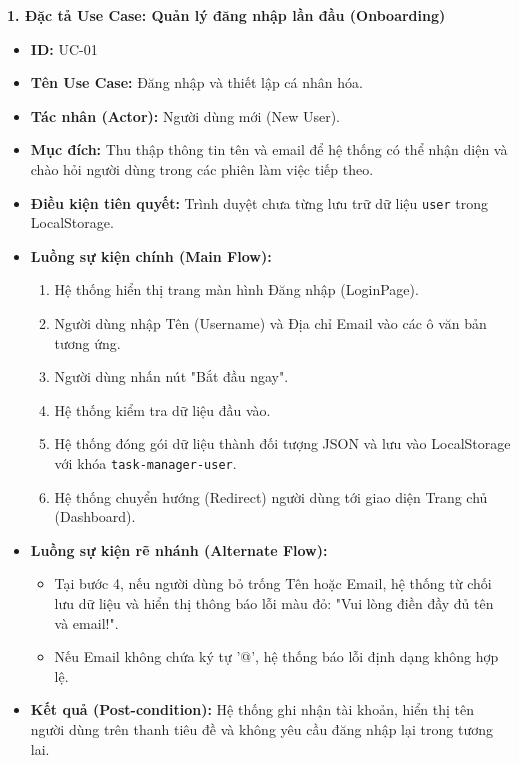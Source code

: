 \textbf{1. Đặc tả Use Case: Quản lý đăng nhập lần đầu (Onboarding)}
\begin{itemize}
    \item \textbf{ID:} UC-01
    \item \textbf{Tên Use Case:} Đăng nhập và thiết lập cá nhân hóa.
    \item \textbf{Tác nhân (Actor):} Người dùng mới (New User).
    \item \textbf{Mục đích:} Thu thập thông tin tên và email để hệ thống có thể nhận diện và chào hỏi người dùng trong các phiên làm việc tiếp theo.
    \item \textbf{Điều kiện tiên quyết:} Trình duyệt chưa từng lưu trữ dữ liệu \texttt{user} trong LocalStorage.
    \item \textbf{Luồng sự kiện chính (Main Flow):}
    \begin{enumerate}
        \item Hệ thống hiển thị trang màn hình Đăng nhập (LoginPage).
        \item Người dùng nhập Tên (Username) và Địa chỉ Email vào các ô văn bản tương ứng.
        \item Người dùng nhấn nút "Bắt đầu ngay".
        \item Hệ thống kiểm tra dữ liệu đầu vào.
        \item Hệ thống đóng gói dữ liệu thành đối tượng JSON và lưu vào LocalStorage với khóa \texttt{task-manager-user}.
        \item Hệ thống chuyển hướng (Redirect) người dùng tới giao diện Trang chủ (Dashboard).
    \end{enumerate}
    \item \textbf{Luồng sự kiện rẽ nhánh (Alternate Flow):} 
    \begin{itemize}
        \item Tại bước 4, nếu người dùng bỏ trống Tên hoặc Email, hệ thống từ chối lưu dữ liệu và hiển thị thông báo lỗi màu đỏ: "Vui lòng điền đầy đủ tên và email!".
        \item Nếu Email không chứa ký tự '@', hệ thống báo lỗi định dạng không hợp lệ.
    \end{itemize}
    \item \textbf{Kết quả (Post-condition):} Hệ thống ghi nhận tài khoản, hiển thị tên người dùng trên thanh tiêu đề và không yêu cầu đăng nhập lại trong tương lai.
\end{itemize}

